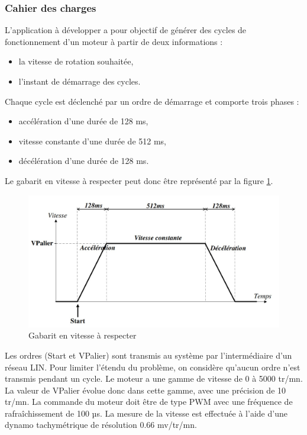 \documentclass[a4paper]{article}
\begin{document}
    \subsubsection{Cahier des charges}
    L’application à développer a pour objectif de générer des cycles de fonctionnement d’un moteur à partir de deux informations :
    \begin{itemize}
		\item la vitesse de rotation souhaitée,
		\item l’instant de démarrage des cycles.
	\end{itemize}
	Chaque cycle est déclenché par un ordre de démarrage et comporte trois phases :
    \begin{itemize}
		\item accélération d’une durée de 128 ms,
		\item vitesse constante d’une durée de 512 ms,
		\item décélération d’une durée de 128 ms.
	\end{itemize}
	Le gabarit en vitesse à respecter peut donc être représenté par la figure \ref{pic1}.\\
	\begin{figure}[htbp]
		\centering
		\includegraphics[width=0.9\linewidth]{Gabarit en vitesse a respecter.jpg}
		\caption{Gabarit en vitesse à respecter}
		\label{pic1}
	\end{figure}
	Les ordres (Start et VPalier) sont transmis au système par l’intermédiaire d’un réseau LIN. Pour limiter l’étendu du problème, on considère qu’aucun ordre n’est transmis pendant un cycle. Le moteur a une gamme de vitesse de 0 à 5000 tr/mn. La valeur de VPalier évolue donc dans cette gamme, avec une précision de 10 tr/mn. La commande du moteur doit être de type PWM avec une fréquence de rafraîchissement de 100 µs. La mesure de la vitesse est effectuée à l’aide d’une dynamo tachymétrique de résolution 0.66 mv/tr/mn.
\end{document}

